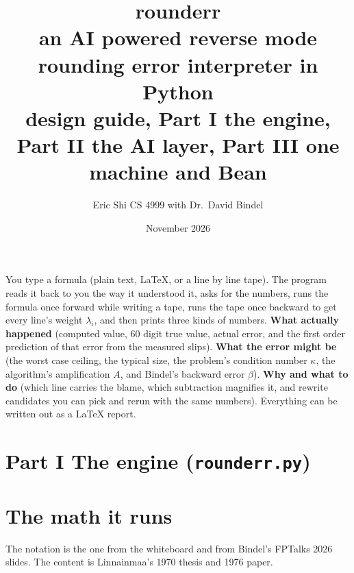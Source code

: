 \documentclass[11pt]{article}
\title{\textbf{rounderr}\\[2pt]\large an AI powered reverse mode rounding error interpreter in Python\\[2pt]\normalsize design guide, Part I the engine, Part II the AI layer, Part III one machine and Bean}
\author{Eric Shi \quad CS 4999 with Dr.\ David Bindel}
\date{November 2026}
\newcommand{\lam}{\lambda}
\begin{document}
\maketitle

\begin{idea}
You type a formula (plain text, LaTeX, or a line by line tape). The program reads it back to you the way it understood it, asks for the numbers, runs the formula once forward while writing a tape, runs the tape once backward to get every line's weight $\lam_i$, and then prints three kinds of numbers. \textbf{What actually happened} (computed value, 60 digit true value, actual error, and the first order prediction of that error from the measured slips). \textbf{What the error might be} (the worst case ceiling, the typical size, the problem's condition number $\kappa$, the algorithm's amplification $A$, and Bindel's backward error $\beta$). \textbf{Why and what to do} (which line carries the blame, which subtraction magnifies it, and rewrite candidates you can pick and rerun with the same numbers). Everything can be written out as a LaTeX report.
\end{idea}

\section*{Part I \quad The engine (\texttt{rounderr.py})}
\section{The math it runs}

The notation is the one from the whiteboard and from Bindel's FPTalks 2026 slides. The content is Linnainmaa's 1970 thesis and 1976 paper.
\end{document}
